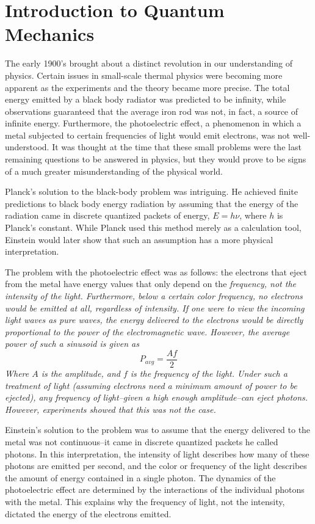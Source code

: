 \chapter{Introduction to Quantum Mechanics}

The early 1900's brought about a distinct revolution in our understanding of
physics. Certain issues in small-scale thermal physics were becoming more
apparent as the experiments and the theory became more precise.
The total energy emitted by a black body radiator was
predicted to be infinity, while observations guaranteed that the average iron
rod was not, in fact, a source of infinite energy. Furthermore, the
photoelectric effect, a phenomenon in which a metal subjected to certain
frequencies of light would emit electrons, was not well-understood. It was
thought at the time that these small problems were the last remaining questions
to be answered in physics, but they would prove to be signs of a much greater
misunderstanding of the physical world.

Planck's solution to the black-body problem was intriguing. He achieved
finite predictions to black body energy radiation by assuming that the
energy of the radiation came in discrete quantized packets of energy, $E=h\nu$,
where $h$ is Planck's constant. While Planck used this method merely as a
calculation tool, Einstein would later show that such an assumption has a more
physical interpretation.

The problem with the photoelectric effect was as follows: the electrons that
eject from the metal have energy values that only depend on the \em{frequency},
not the \em{intensity} of the light. Furthermore, below a certain color
frequency, no electrons would be emitted at all, regardless of intensity. If one
were to view the incoming light waves as pure waves, the energy delivered to the
electrons would be directly proportional to the power of the electromagnetic
wave. However, the average power of such a sinusoid is given as 
\[
    P_{avg} = \frac{Af}{2}
\]
Where $A$ is the amplitude, and $f$ is the frequency of the light. Under such a
treatment of light (assuming electrons need a minimum amount of power to be
ejected), any frequency of light--given a high enough amplitude--can eject
photons. However, experiments showed that this was not the case.

Einstein's solution to the problem was to assume that the energy delivered to
the metal was not continuous--it came in discrete quantized packets he called
photons. In this interpretation, the intensity of light describes how many of
these photons are emitted per second, and the color or frequency of the light
describes the amount of energy contained in a single photon. The dynamics of the
photoelectric effect are determined by the interactions of the individual
photons with the metal. This explains why the frequency of light, not the
intensity, dictated the energy of the electrons emitted.

